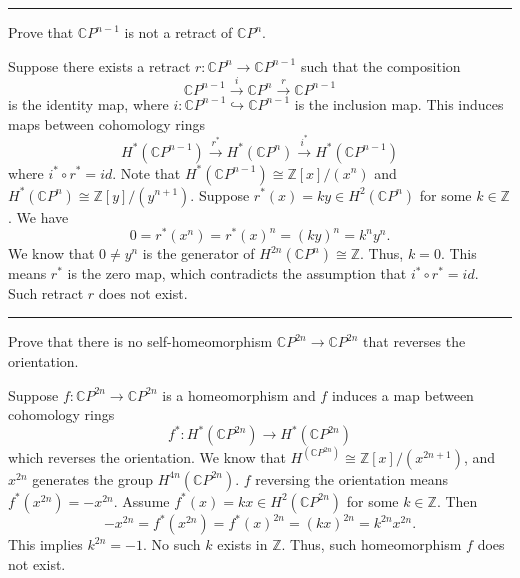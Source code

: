 \documentclass[letterpaper, 12pt]{article}
\begin{document}
\noindent\rule{7in}{2.8pt}
\begin{problem}{3}
Prove that \(\mathbb{C}P^{n-1}\) is not a retract of \(\mathbb{C}P^n\).
\end{problem}
\begin{solution}
Suppose there exists a retract \(r:\mathbb{C}P^n\rightarrow \mathbb{C}P^{n-1}\) such that the composition 
\[\mathbb{C}P^{n-1}\xrightarrow{i} \mathbb{C}P^n\xrightarrow{r}\mathbb{C}P^{n-1}\]
is the identity map, where \(i:\mathbb{C}P^{n-1}\hookrightarrow \mathbb{C}P^{n-1}\) is the inclusion map. This induces maps between cohomology rings 
\[H^*(\mathbb{C}P^{n-1})\xrightarrow{r^*}H^*(\mathbb{C}P^n)\xrightarrow{i^*}H^*(\mathbb{C}P^{n-1})\]
where \(i^*\circ r^*=id\). Note that \(H^*(\mathbb{C}P^{n-1})\cong \mathbb{Z}[x]/(x^n)\) and \(H^*(\mathbb{C}P^n)\cong \mathbb{Z}[y]/(y^{n+1})\). Suppose \(r^*(x)=ky\in H^2(\mathbb{C}P^n)\) for some \(k\in \mathbb{Z}\). We have 
\[0=r^*(x^n)=r^*(x)^n=(ky)^n=k^ny^n.\]
We know that \(0\neq y^n\) is the generator of \(H^{2n}(\mathbb{C}P^n)\cong \mathbb{Z}\). Thus, \(k=0\). This means \(r^*\) is the zero map, which contradicts the assumption that \(i^*\circ r^*=id\). Such retract \(r\) does not exist. 
\end{solution}

\noindent\rule{7in}{2.8pt}
\begin{problem}{4}
Prove that there is no self-homeomorphism \(\mathbb{C}P^{2n}\rightarrow \mathbb{C}P^{2n}\) that reverses the orientation. 
\end{problem}
\begin{solution}
Suppose \(f:\mathbb{C}P^{2n}\rightarrow \mathbb{C}P^{2n}\) is a homeomorphism and \(f\) induces a map between cohomology rings 
\[f^*:H^*(\mathbb{C}P^{2n})\rightarrow H^*(\mathbb{C}P^{2n})\]
which reverses the orientation. We know that \(H^(\mathbb{C}P^{2n})\cong \mathbb{Z}[x]/(x^{2n+1})\), and \(x^{2n}\) generates the group \(H^{4n}(\mathbb{C}P^{2n})\). \(f\) reversing the orientation means \(f^*(x^{2n})=-x^{2n}\). Assume \(f^*(x)=kx\in H^2(\mathbb{C}P^{2n})\) for some \(k\in \mathbb{Z}\). Then 
\[-x^{2n}=f^*(x^{2n})=f^*(x)^{2n}=(kx)^{2n}=k^{2n}x^{2n}.\]
This implies \(k^{2n}=-1\). No such \(k\) exists in \(\mathbb{Z}\). Thus, such homeomorphism \(f\) does not exist. 
\end{solution}
\end{document}
